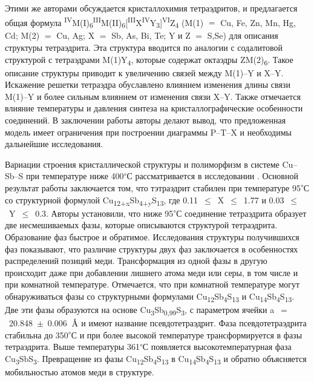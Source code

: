 Этими же авторами \cite{Johnson1988} обсуждается кристаллохимия тетраэдритов, и предлагается общая формула \textsuperscript{IV}M(I)\textsubscript{6}\textsuperscript{III}M(II)\textsubscript{6}[\textsuperscript{III}X\textsuperscript{IV}Y\textsubscript{3}]\textsuperscript{VI}Z\textsubscript{4} (M(1) $=$ Cu, Fe, Zn, Mn, Hg, Cd; M(2) $=$ Cu, Ag; X $=$ Sb, As, Bi, Te; Y и Z $=$ S,Se)  для описания структуры тетраэдрита. Эта структура вводится по аналогии с содалитовой структурой с тетраэдрами M(1)Y\textsubscript{4}, которые содержат октаэдры ZM(2)\textsubscript{6}. Такое описание структуры приводит к увеличению связей между M(1)--Y и X--Y. Искажение решетки тетраэдра обуславлено влиянием изменения длины связи M(1)--Y и более сильным влиянием от изменения связи X--Y. Также отмечается влияние температуры и давления синтеза на кристаллографические особенности соединений. В заключении работы авторы делают вывод, что предложенная модель имеет ограничения при построении диаграммы P--T--X и необходимы дальнейшие исследования.

Вариации строения кристаллической структуры и полиморфизм в системе Cu--Sb--S при температуре ниже 400\textsuperscript{$\circ$}С рассматривается в исследовании \cite{Tatsuka_1977}. Основной результат работы заключается том, что тэтраэдрит стабилен при температуре 95\textsuperscript{$\circ$}С со структурной формулой Cu\textsubscript{12+x}Sb\textsubscript{4+y}S\textsubscript{13}, где 0.11~$\leqslant$~X~$\leqslant$~1.77 и 0.03~$\leqslant$~Y~$\leqslant$~0.3. Авторы установили, что ниже 95\textsuperscript{$\circ$}С соединение тетраэдрита образует две несмешиваемых фазы, которые описываются структурой тетраэдрита. Образование фаз быстрое и обратимое. Исследования структуры получившихся фаз показывают, что различие структуры двух фаз заключается в особенностях распределений позиций меди. Трансформация из одной фазы в другую происходит даже при добавлении лишнего атома меди или серы, в том числе и при комнатной температуре. Отмечается, что при комнатной температуре могут обнаруживаться фазы со структурными формулами Cu\textsubscript{12}Sb\textsubscript{4}S\textsubscript{13} и Cu\textsubscript{14}Sb\textsubscript{4}S\textsubscript{13}. Две эти фазы образуются на основе Cu\textsubscript{3}Sb\textsubscript{0,99}S\textsubscript{3}, с параметром ячейки a~$=$~20.848~$\pm$~0.006~$\mbox{\normalfont\AA}$ и имеют название псевдотетраэдрит. Фаза псевдотетраэдрита стабильна до 350\textsuperscript{$\circ$}С и при более высокой температуре трансформируется в фазы тетраэдрита. Выше температуры 361\textsuperscript{$\circ$}С появляется высокотемпературная фаза Cu\textsubscript{3}SbS\textsubscript{3}. Превращение из фазы Cu\textsubscript{12}Sb\textsubscript{4}S\textsubscript{13} в Cu\textsubscript{14}Sb\textsubscript{4}S\textsubscript{13} и обратно объясняется мобильностью атомов меди в структуре.

